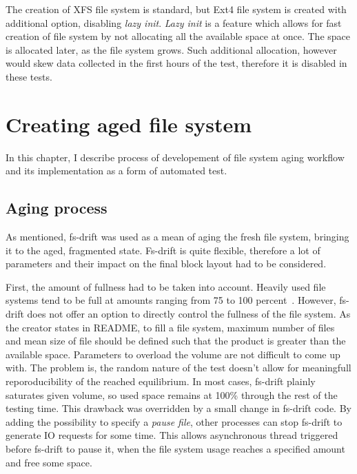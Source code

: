 \documentclass[
  color, %
  table, %
  lof,   %
  lot,   %
]{fithesis3}
\begin{document}
The creation of XFS file system is standard, but Ext4 file system is created with additional option, disabling \textit{lazy init}. \textit{Lazy init} is a feature which allows for fast creation of file system by not allocating all the available space at once. The space is allocated later, as the file system grows. Such additional allocation, however would skew data collected in the first hours of the test, therefore it is disabled in these tests.



\chapter{Creating aged file system}
In this chapter, I describe process of developement of file system aging workflow and its implementation as a form of automated test.

\section{Aging process}
As mentioned, fs-drift was used as a mean of aging the fresh file system, bringing it to the aged, fragmented state. Fs-drift is quite flexible, therefore a lot of parameters and their impact on the final block layout had to be considered.

First, the amount of fullness had to be taken into account. Heavily used file systems tend to be full at amounts ranging from 75 to 100 percent~\cite{agrawal2007five}. However, fs-drift does not offer an option to directly control the fullness of the file system. As the creator states in README, to fill a file system, maximum number of files and mean size of file should be defined such that the product is greater than the available space. Parameters to overload the volume are not difficult to come up with. The problem is, the random nature of the test doesn't allow for meaningfull reporoducibility of the reached equilibrium. In most cases, fs-drift plainly saturates given volume, so used space remains at 100\% through the rest of the testing time. This drawback was overridden by a small change in fs-drift code\footnotemark[1]. By adding the possibility to specify a \textit{pause file}, other processes can stop fs-drift to generate IO requests for some time. This allows asynchronous thread triggered before fs-drift to pause it, when the file system usage reaches a specified amount and free some space.

\end{document}
